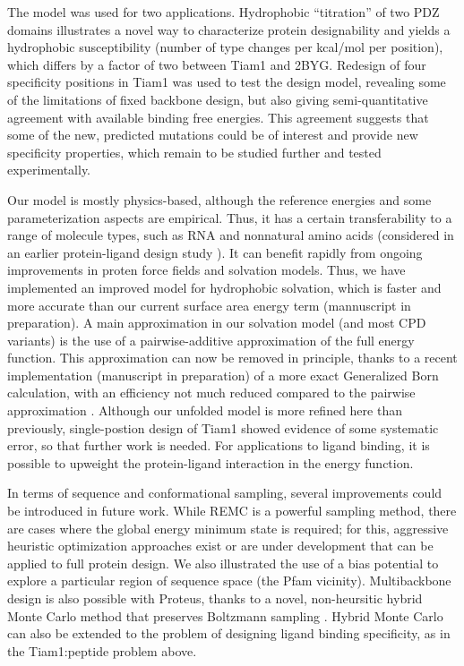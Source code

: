 \documentclass[12pt]{article}
\begin{document}
The model was used for two applications. Hydrophobic ``titration'' of two PDZ domains illustrates a novel way to characterize 
protein designability and yields a hydrophobic susceptibility (number of type changes per kcal/mol per position), which differs
by a factor of two between Tiam1 and 2BYG. Redesign of four specificity positions in Tiam1 was used to test the design model,
revealing some of the limitations of fixed backbone design, but also giving semi-quantitative agreement with available binding
free energies. This agreement suggests that some of the new, predicted mutations could be of interest and provide new specificity
properties, which remain to be studied further and tested experimentally.

Our model is mostly physics-based, although the reference energies and some parameterization aspects are empirical. Thus, it
has a certain transferability to a range of molecule types, such as RNA and nonnatural amino acids (considered in an earlier
protein-ligand design study \cite{Druart16}). It can benefit rapidly from ongoing improvements in proten force fields and
solvation models. Thus, we have implemented an improved model for hydrophobic solvation, which is faster and more accurate than
our current surface area energy term (mannuscript in preparation). A main approximation in our solvation model (and most CPD
variants) is the use of a pairwise-additive approximation of the full energy function. This approximation can now be removed
in principle, thanks to a recent implementation (manuscript in preparation) of a more exact Generalized Born calculation, with
an efficiency not much reduced compared to the pairwise approximation \cite{Archontis05b}. Although our unfolded model is more
refined here than previously, single-postion design of Tiam1 showed evidence of some systematic error, so that further work is
needed. For applications to ligand binding, it is possible to upweight the protein-ligand interaction in the energy function.

In terms of sequence and conformational sampling, several improvements could be introduced in future work. While REMC is a
powerful sampling method, there are cases where the global energy minimum state is required; for this, aggressive heuristic
optimization approaches exist or are under development that can be applied to full protein design. We also illustrated the
use of a bias potential to explore a particular region of sequence space (the Pfam vicinity). Multibackbone design is also
possible with Proteus, thanks to a novel, non-heursitic hybrid Monte Carlo method that preserves Boltzmann sampling
\cite{Druart17}. Hybrid Monte Carlo can also be extended to the problem of designing ligand binding specificity, as in the
Tiam1:peptide problem above.
\end{document}
